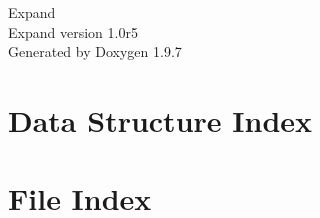 \documentclass[twoside]{book}
\newcommand{\+}{\discretionary{\mbox{\scriptsize$\hookleftarrow$}}{}{}}
\newcommand{\clearemptydoublepage}{%
    \newpage{\pagestyle{empty}\cleardoublepage}%
  }
\begin{document}
  \raggedbottom
    \hypersetup{pageanchor=false,
                bookmarksnumbered=true,
                pdfencoding=unicode
               }
  \begin{titlepage}
  \vspace*{7cm}
  \begin{center}%
  {\Large Expand}\\
  [1ex]\large Expand version 1.\+0r5 \\
  \vspace*{1cm}
  {\large Generated by Doxygen 1.9.7}\\
  \end{center}
  \end{titlepage}
  \clearemptydoublepage
  \tableofcontents
  \clearemptydoublepage
  \hypersetup{pageanchor=true}


\chapter{Data Structure Index}

\chapter{File Index}

\end{document}
